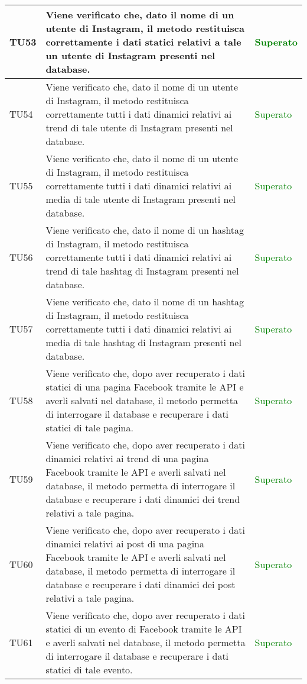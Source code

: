 \begin{center}
\begin{longtable}{| p{2cm} | p{8cm} | p{2.5cm} |}
					\hline
					TU53 & Viene verificato che, dato il nome di un utente di Instagram, il metodo restituisca correttamente i dati statici relativi a tale un utente di Instagram presenti nel database. & \textcolor{green}{Superato}\\
					\hline
					TU54 & Viene verificato che, dato il nome di un utente di Instagram, il metodo restituisca correttamente tutti i dati dinamici relativi ai trend di tale utente di Instagram presenti nel database. & \textcolor{green}{Superato}\\
					\hline
					TU55 & Viene verificato che, dato il nome di un utente di Instagram, il metodo restituisca correttamente tutti i dati dinamici relativi ai media di tale utente di Instagram presenti nel database. & \textcolor{green}{Superato}\\
					\hline
					TU56 & Viene verificato che, dato il nome di un hashtag di Instagram, il metodo restituisca correttamente tutti i dati dinamici relativi ai trend di tale hashtag di Instagram presenti nel database. & \textcolor{green}{Superato}\\
					\hline
					TU57 & Viene verificato che, dato il nome di un hashtag di Instagram, il metodo restituisca correttamente tutti i dati dinamici relativi ai media di tale hashtag di Instagram presenti nel database. & \textcolor{green}{Superato}\\
					\hline
					TU58 & Viene verificato che, dopo aver recuperato i dati statici di una pagina Facebook tramite le API e averli salvati nel database, il metodo permetta di interrogare il database e recuperare i dati statici di tale pagina. & \textcolor{green}{Superato}\\
					\hline
					TU59 & Viene verificato che, dopo aver recuperato i dati dinamici relativi ai trend di una pagina Facebook tramite le API e averli salvati nel database, il metodo permetta di interrogare il database e recuperare i dati dinamici dei trend relativi a tale pagina. & \textcolor{green}{Superato}\\
					\hline	
					TU60 & Viene verificato che, dopo aver recuperato i dati dinamici relativi ai post di una pagina Facebook tramite le API e averli salvati nel database, il metodo permetta di interrogare il database e recuperare i dati dinamici dei post relativi a tale pagina. & \textcolor{green}{Superato}\\
					\hline	
					TU61 & Viene verificato che, dopo aver recuperato i dati statici di un evento di Facebook tramite le API e averli salvati nel database, il metodo permetta di interrogare il database e recuperare i dati statici di tale evento. & \textcolor{green}{Superato}\\

\end{longtable}
\end{center}
